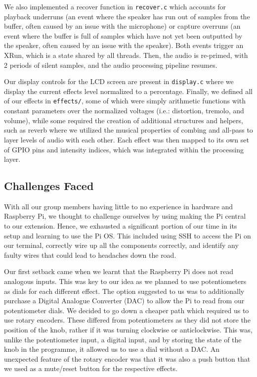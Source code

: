 \documentclass{article}
\begin{document}
We also implemented a recover function in \verb|recover.c| which accounts for playback underruns (an event where the speaker has run out of samples from the buffer, often caused by an issue with the microphone) or capture overruns (an event where the buffer is full of samples which have not yet been outputted by the speaker, often caused by an issue with the speaker). Both events trigger an XRun, which is a state shared by all threads. Then, the audio is re-primed, with 2 periods of silent samples, and the audio processing pipeline resumes. 

Our display controls for the LCD screen are present in \verb|display.c| where we display the current effects level normalized to a percentage. Finally, we defined all of our effects in \verb|effects/|, some of which were simply arithmetic functions with constant parameters over the normalized voltages (i.e.: distortion, tremolo, and volume), while some required the creation of additional structures and helpers, such as reverb where we utilized the musical properties of combing and all-pass to layer levels of audio with each other. Each effect was then mapped to its own set of GPIO pins and intensity indices, which was integrated within the processing layer. 


\subsection{Challenges Faced}

With all our group members having little to no experience in hardware and Raspberry Pi, we thought to challenge ourselves by using making the Pi central to our extension. Hence, we exhausted a significant portion of our time in its setup and learning to use the Pi OS. This included using SSH to access the Pi on our terminal, correctly wire up all the components correctly, and identify any faulty wires that could lead to headaches down the road.

Our first setback came when we learnt that the Raspberry Pi does not read analogous inputs. This was key to our idea as we planned to use potentiometers as dials for each different effect. The option suggested to us was to additionally purchase a Digital Analogue Converter (DAC) to allow the Pi to read from our potentiometer dials. We decided to go down a cheaper path which required us to use rotary encoders. These differed from potentiometers as they did not store the position of the knob, rather if it was turning clockwise or anticlockwise. This was, unlike the potentiometer input, a digital input, and by storing the state of the knob in the programme, it allowed us to use a dial without a DAC. An unexpected feature of the rotary encoder was that it was also a push button that we used as a mute/reset button for the respective effects. 
\end{document}
